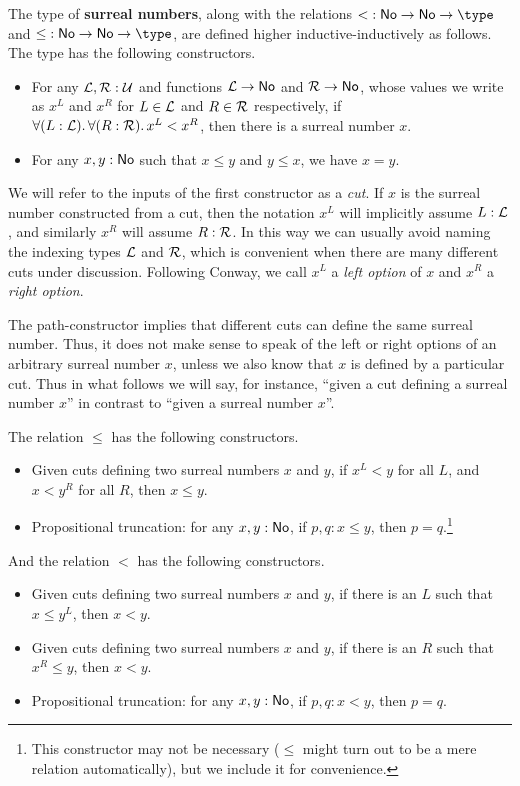 \begin{defn}
  The type \NO of \textbf{surreal numbers}, along with the relations $\mathord<:\NO\to\NO\to\type$ and $\mathord\le:\NO\to\NO\to\type$, are defined higher inductive-inductively as follows.
  The type \NO has the following constructors.
  \begin{itemize}
  \item For any $\mathcal{L},\mathcal{R}:\mathcal{U}$ and functions $\mathcal{L}\to \mathsf{No}$ and $\mathcal{R}\to \mathsf{No}$, whose values we write as $x^L$ and $x^R$ for $L\in\mathcal{L}$ and $R\in\mathcal{R}$ respectively, if $\fall{L:\LL}{R:\RR} x^L<x^R$, then there is a surreal number $x$.
  \item For any $x,y:\mathsf{No}$ such that $x\le y$ and $y\le x$, we have $x=y$.
  \end{itemize}
  We will refer to the inputs of the first constructor as a \emph{cut}.
  If $x$ is the surreal number constructed from a cut, then the notation $x^L$ will implicitly assume $L:\mathcal{L}$, and similarly $x^R$ will assume $R:\mathcal{R}$.
  In this way we can usually avoid naming the indexing types $\mathcal{L}$ and $\mathcal{R}$, which is convenient when there are many different cuts under discussion.
  Following Conway, we call $x^L$ a \emph{left option} of $x$ and $x^R$ a \emph{right option}.

  The path-constructor implies that different cuts can define the same surreal number.
  Thus, it does not make sense to speak of the left or right options of an arbitrary surreal number $x$, unless we also know that $x$ is defined by a particular cut.
  Thus in what follows we will say, for instance, ``given a cut defining a surreal number $x$'' in contrast to ``given a surreal number $x$''.

  The relation $\le$ has the following constructors.
  \begin{itemize}
  \item Given cuts defining two surreal numbers $x$ and $y$, if $x^L<y$ for all $L$, and $x<y^R$ for all $R$, then $x\le y$.
  \item Propositional truncation: for any $x,y:\mathsf{No}$, if $p,q:x\le y$, then $p=q$.\footnote{This constructor may not be necessary ($\le$ might turn out to be a mere relation automatically), but we include it for convenience.}
  \end{itemize}
  And the relation $<$ has the following constructors.
  \begin{itemize}
  \item Given cuts defining two surreal numbers $x$ and $y$, if there is an $L$ such that $x\le y^L$, then $x<y$.
  \item Given cuts defining two surreal numbers $x$ and $y$, if there is an $R$ such that $x^R\le y$, then $x<y$.
  \item Propositional truncation: for any $x,y:\mathsf{No}$, if $p,q:x<y$, then $p=q$.
  \end{itemize}
\end{defn}


